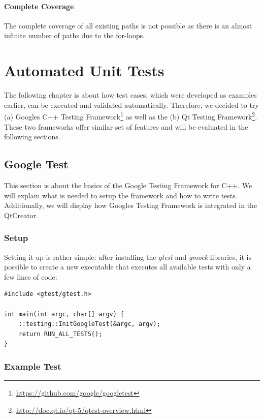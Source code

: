 \documentclass{scrreprt}
\begin{document}
\paragraph{Complete Coverage} The complete coverage of all existing paths is not possible as there is an almost infinite number of paths due to the for-loops.


\section{Automated Unit Tests}

The following chapter is about how test cases, which were developed as examples earlier, can be executed and validated automatically. Therefore, we decided to try (a) Googles C++ Testing Framework\footnote{\url{https://github.com/google/googletest}} as well as the (b) Qt Testing Framework\footnote{\url{http://doc.qt.io/qt-5/qtest-overview.html}}. These two frameworks offer similar set of features and will be evaluated in the following sections.

\subsection{Google Test}

This section is about the basics of the Google Testing Framework for C++. We will explain what is needed to setup the framework and how to write tests. Additionally, we will display how Googles Testing Framework is integrated in the QtCreator.

\subsubsection{Setup}

Setting it up is rather simple: after installing the \textit{gtest} and \textit{gmock} libraries, it is possible to create a new executable that executes all available tests with only a few lines of code:

\bigskip
\begin{lstlisting}[title=tests-google/main.cpp]
#include <gtest/gtest.h>

int main(int argc, char[] argv) {
	::testing::InitGoogleTest(&argc, argv);
	return RUN_ALL_TESTS();
}
\end{lstlisting}
\bigskip

\subsubsection{Example Test}
\end{document}
